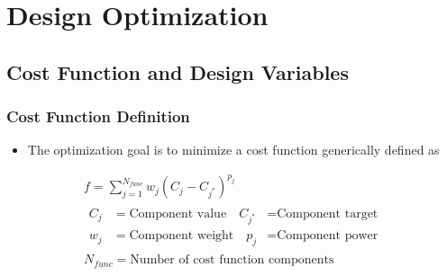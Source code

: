 \documentclass{beamer}
\begin{document}
\section{Design Optimization}
\subsection{Cost Function and Design Variables}

\begin{frame}
  \frametitle{Cost Function Definition}
  \begin{itemize}
    \item The optimization goal is to minimize a cost function generically
      defined as
  \end{itemize}
  \vspace{-0.1cm}
\begin{gather*}
  f = \sum_{j=1}^{N_{func}}w_j\left( C_j - C_{j^*} \right)^{p_j} \\
  \begin{aligned}
    C_j &= \text{Component value} \quad C_{j^*} &= \text{Component target} \\
    w_j &= \text{Component weight} \quad p_j &= \text{Component power}
  \end{aligned} \\
  N_{func} = \text{Number of cost function components}
\end{gather*}
\end{frame}
\end{document}
